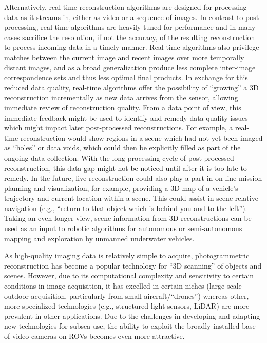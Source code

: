 \documentclass[letterpaper,12pt]{article}
\begin{document}
Alternatively, real-time reconstruction algorithms are designed for processing data as it streams in, either as video or a sequence of images.   In contrast to post-processing, real-time algorithms are heavily tuned for performance and in many cases sacrifice the resolution, if not the accuracy, of the resulting reconstruction to process incoming data in a timely manner.   Real-time algorithms also privilege matches between the current image and recent images over more temporally distant images, and as a broad generalization produce less complete inter-image correspondence sets and thus less optimal final products.   In exchange for this reduced data quality, real-time algorithms offer the possibility of ``growing'' a 3D reconstruction incrementally as new data arrives from the sensor, allowing immediate review of reconstruction quality.    From a data point of view, this immediate feedback might be used to identify and remedy data quality issues which might impact later post-processed reconstructions.  For example, a real-time reconstruction would show regions in a scene which had not yet been imaged as ``holes'' or data voids, which could then be explicitly filled as part of the ongoing data collection.   With the long processing cycle of post-processed reconstruction, this data gap might not be noticed until after it is too late to remedy.  In the future,  live reconstruction could also play a part in on-line mission planning and visualization, for example, providing a 3D map of a vehicle's trajectory and current location within a scene.  This could assist in scene-relative navigation (e.g., ``return to that object which is behind you and to the left'').    Taking an even longer view, scene information from 3D reconstructions can be used as an input to robotic algorithms for autonomous or semi-autonomous mapping and exploration by unmanned underwater vehicles.  

As high-quality imaging data is relatively simple to acquire, photogrammetric reconstruction has become a popular technology for ``3D scanning'' of objects and scenes.  However, due to its computational complexity and sensitivity to certain conditions in image acquisition, it has excelled in certain niches (large scale outdoor acquisition, particularly from small aircraft/``drones'') whereas other, more specialized technologies (e.g., structured light sensors, LiDAR) are more prevalent in other applications.      Due to the challenges in developing and adapting new technologies for subsea use, the ability to exploit the broadly installed base of video cameras on ROVs becomes even more attractive.
\end{document}
